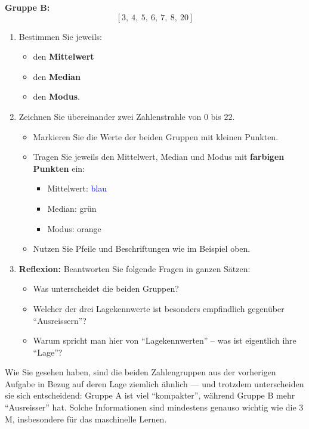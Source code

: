 \begin{lpu}
\begin{aufgabe}{1}
\textbf{Gruppe B:}
\[
[3,\ 4,\ 5,\ 6,\ 7,\ 8,\ 20]
\]

\begin{enumerate}
  \item Bestimmen Sie jeweils:
    \begin{itemize}
      \item den \textbf{Mittelwert}
      \item den \textbf{Median}
      \item den \textbf{Modus}.
    \end{itemize}

  \item Zeichnen Sie übereinander zwei Zahlenstrahle von $0$ bis $22$.
    \begin{itemize}
      \item Markieren Sie die Werte der beiden Gruppen mit kleinen Punkten.
      \item Tragen Sie jeweils den Mittelwert, Median und Modus mit \textbf{farbigen Punkten} ein:
        \begin{itemize}
          \item Mittelwert: \textcolor{blue}{blau}
          \item Median: \textcolor{green!70!black}{grün}
          \item Modus: \textcolor{orange!90!black}{orange}
        \end{itemize}
        \item Nutzen Sie Pfeile und Beschriftungen wie im Beispiel oben.
    \end{itemize}
      \item \textbf{Reflexion:} Beantworten Sie folgende Fragen in ganzen Sätzen:
    \begin{itemize}
      \item Was unterscheidet die beiden Gruppen?
      \item Welcher der drei Lagekennwerte ist besonders empfindlich gegenüber ``Ausreissern''?
      \item Warum spricht man hier von ``Lagekennwerten'' – was ist eigentlich ihre ``Lage''?
    \end{itemize}
\end{enumerate}

\end{aufgabe}


Wie Sie gesehen haben, sind die beiden Zahlengruppen aus der vorherigen Aufgabe in Bezug auf deren Lage ziemlich ähnlich — und trotzdem unterscheiden sie sich entscheidend: Gruppe A ist viel ``kompakter'', während Gruppe B mehr ``Ausreisser'' hat. Solche Informationen sind mindestens genauso wichtig wie die 3 M, insbesondere für das maschinelle Lernen.


\end{lpu}
